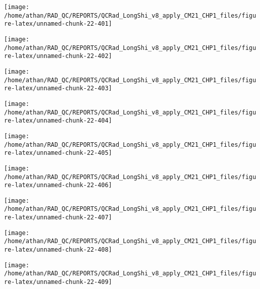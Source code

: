 \documentclass[
  10pt,
  a4paper,oneside]{article}
\begin{document}
\begin{center}\texttt{[image: /home/athan/RAD\_QC/REPORTS/QCRad\_LongShi\_v8\_apply\_CM21\_CHP1\_files/figure-latex/unnamed-chunk-22-401]} \end{center}

\begin{center}\texttt{[image: /home/athan/RAD\_QC/REPORTS/QCRad\_LongShi\_v8\_apply\_CM21\_CHP1\_files/figure-latex/unnamed-chunk-22-402]} \end{center}

\begin{center}\texttt{[image: /home/athan/RAD\_QC/REPORTS/QCRad\_LongShi\_v8\_apply\_CM21\_CHP1\_files/figure-latex/unnamed-chunk-22-403]} \end{center}

\begin{center}\texttt{[image: /home/athan/RAD\_QC/REPORTS/QCRad\_LongShi\_v8\_apply\_CM21\_CHP1\_files/figure-latex/unnamed-chunk-22-404]} \end{center}

\begin{center}\texttt{[image: /home/athan/RAD\_QC/REPORTS/QCRad\_LongShi\_v8\_apply\_CM21\_CHP1\_files/figure-latex/unnamed-chunk-22-405]} \end{center}

\begin{center}\texttt{[image: /home/athan/RAD\_QC/REPORTS/QCRad\_LongShi\_v8\_apply\_CM21\_CHP1\_files/figure-latex/unnamed-chunk-22-406]} \end{center}

\begin{center}\texttt{[image: /home/athan/RAD\_QC/REPORTS/QCRad\_LongShi\_v8\_apply\_CM21\_CHP1\_files/figure-latex/unnamed-chunk-22-407]} \end{center}

\begin{center}\texttt{[image: /home/athan/RAD\_QC/REPORTS/QCRad\_LongShi\_v8\_apply\_CM21\_CHP1\_files/figure-latex/unnamed-chunk-22-408]} \end{center}

\begin{center}\texttt{[image: /home/athan/RAD\_QC/REPORTS/QCRad\_LongShi\_v8\_apply\_CM21\_CHP1\_files/figure-latex/unnamed-chunk-22-409]} \end{center}
\end{document}
